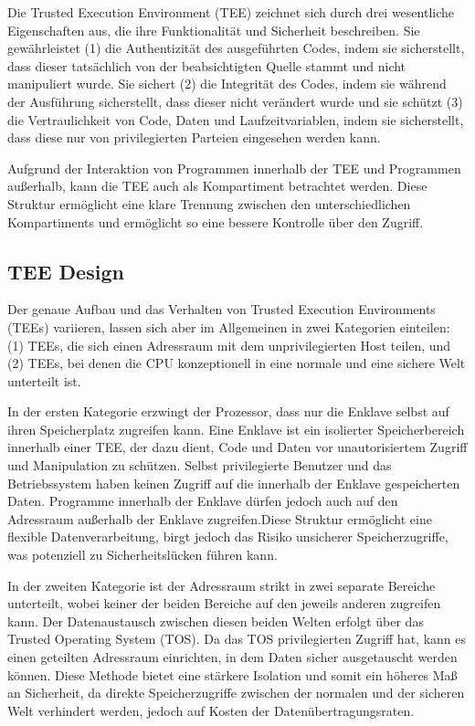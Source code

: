 Die Trusted Execution Environment (TEE) zeichnet sich durch drei wesentliche Eigenschaften aus, die ihre Funktionalität und Sicherheit beschreiben. Sie gewährleistet (1) die Authentizität des ausgeführten Codes, indem sie sicherstellt, dass dieser tatsächlich von der beabsichtigten Quelle stammt und nicht manipuliert wurde.  Sie sichert (2) die Integrität des Codes, indem sie während der Ausführung sicherstellt, dass dieser nicht verändert wurde und sie schützt (3) die Vertraulichkeit von Code, Daten und Laufzeitvariablen, indem sie sicherstellt, dass diese nur von privilegierten Parteien eingesehen werden kann. 

Aufgrund der Interaktion von Programmen innerhalb der TEE und Programmen außerhalb, kann die TEE auch als Kompartiment betrachtet werden. Diese Struktur ermöglicht eine klare Trennung zwischen den unterschiedlichen Kompartiments und ermöglicht so eine bessere Kontrolle über den Zugriff.

\subsection{TEE Design}
Der genaue Aufbau und das Verhalten von Trusted Execution Environments (TEEs) variieren, lassen sich aber im Allgemeinen in zwei Kategorien einteilen: (1) TEEs, die sich einen Adressraum mit dem unprivilegierten Host teilen, und (2) TEEs, bei denen die CPU konzeptionell in eine normale und eine sichere Welt unterteilt ist.

In der ersten Kategorie erzwingt der Prozessor, dass nur die Enklave selbst auf ihren Speicherplatz zugreifen kann. Eine Enklave ist ein isolierter Speicherbereich innerhalb einer TEE, der dazu dient, Code und Daten vor unautorisiertem Zugriff und Manipulation zu schützen. Selbst privilegierte Benutzer und das Betriebssystem haben keinen Zugriff auf die innerhalb der Enklave gespeicherten Daten. Programme innerhalb der Enklave dürfen jedoch auch auf den Adressraum außerhalb der Enklave zugreifen.Diese Struktur ermöglicht eine flexible Datenverarbeitung, birgt jedoch das Risiko unsicherer Speicherzugriffe, was potenziell zu Sicherheitslücken führen kann.

In der zweiten Kategorie ist der Adressraum strikt in zwei separate Bereiche unterteilt, wobei keiner der beiden Bereiche auf den jeweils anderen zugreifen kann. Der Datenaustausch zwischen diesen beiden Welten erfolgt über das Trusted Operating System (TOS). Da das TOS privilegierten Zugriff hat, kann es einen geteilten Adressraum einrichten, in dem Daten sicher ausgetauscht werden können. Diese Methode bietet eine stärkere Isolation und somit ein höheres Maß an Sicherheit, da direkte Speicherzugriffe zwischen der normalen und der sicheren Welt verhindert werden, jedoch auf Kosten der Datenübertragungsraten.

